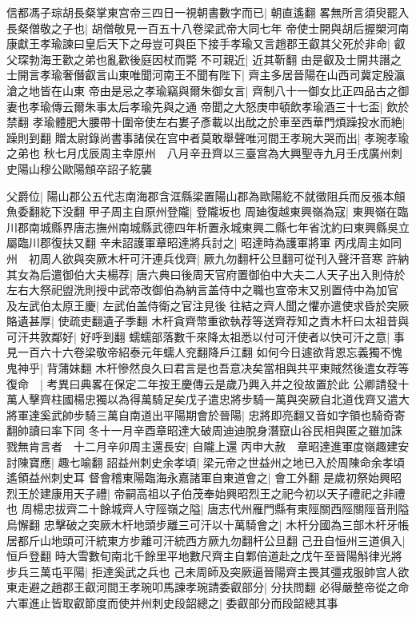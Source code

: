 信都馮子琮胡長粲掌東宫帝三四日一視朝書數字而已|{
	朝直遙翻}
畧無所言須臾罷入長粲僧敬之子也|{
	胡僧敬見一百五十八卷梁武帝大同七年}
帝使士開與胡后握槊河南康獻王孝瑜諫曰皇后天下之母豈可與臣下接手孝瑜又言趙郡王叡其父死於非命|{
	叡父琛勃海王歡之弟也亂歡後庭因杖而斃}
不可親近|{
	近其靳翻}
由是叡及士開共譖之士開言孝瑜奢僭叡言山東唯聞河南王不聞有陛下|{
	齊主多居晉陽在山西司冀定殷瀛滄之地皆在山東}
帝由是忌之孝瑜竊與爾朱御女言|{
	齊制八十一御女比正四品古之御妻也孝瑜傳云爾朱事太后孝瑜先與之通}
帝聞之大怒庚申頓飲孝瑜酒三十七盃|{
	飲於禁翻}
孝瑜體肥大腰帶十圍帝使左右婁子彥載以出酖之於車至西華門煩躁投水而絶|{
	躁則到翻}
贈太尉錄尚書事諸侯在宫中者莫敢舉聲唯河間王孝琬大哭而出|{
	孝琬孝瑜之弟也}
秋七月戊辰周主幸原州　八月辛丑齊以三臺宫為大興聖寺九月壬戌廣州刺史陽山穆公歐陽頠卒詔子紇襲

父爵位|{
	陽山郡公五代志南海郡含洭縣梁置陽山郡為歐陽紇不就徵阻兵而反張本頠魚委翻紇下没翻}
甲子周主自原州登隴|{
	登隴坂也}
周廸復越東興嶺為寇|{
	東興嶺在臨川郡南城縣界唐志撫州南城縣武德四年析置永城東興二縣七年省沈約曰東興縣吳立屬臨川郡復扶又翻}
辛未詔護軍章昭達將兵討之|{
	昭達時為護軍將軍}
丙戌周主如同州　初周人欲與突厥木杆可汗連兵伐齊|{
	厥九勿翻杆公旦翻可從刊入聲汗音寒}
許納其女為后遣御伯大夫楊荐|{
	唐六典曰後周天官府置御伯中大夫二人天子出入則侍於左右大祭祀盥洗則授中武帝改御伯為納言盖侍中之職也宣帝末又别置侍中為加官}
及左武伯太原王慶|{
	左武伯盖侍衛之官注見後}
往結之齊人聞之懼亦遣使求昏於突厥賂遺甚厚|{
	使疏吏翻遺子季翻}
木杆貪齊幣重欲執荐等送齊荐知之責木杆曰太祖昔與可汗共敦鄰好|{
	好呼到翻}
蠕蠕部落數千來降太祖悉以付可汗使者以快可汗之意|{
	事見一百六十六卷梁敬帝紹泰元年蠕人兖翻降戶江翻}
如何今日遽欲背恩忘義獨不愧鬼神乎|{
	背蒲妹翻}
木杆慘然良久曰君言是也吾意决矣當相與共平東賊然後遣女荐等復命　|{
	考異曰典畧在保定二年按王慶傳云是歲乃興入并之役故置於此}
公卿請發十萬人擊齊柱國楊忠獨以為得萬騎足矣戊子遣忠將步騎一萬與突厥自北道伐齊又遣大將軍達奚武帥步騎三萬自南道出平陽期會於晉陽|{
	忠將即亮翻又音如字領也騎奇寄翻帥讀曰率下同}
冬十一月辛酉章昭達大破周迪迪脫身潛竄山谷民相與匿之雖加誅戮無肯言者　十二月辛卯周主還長安|{
	自隴上還}
丙申大赦　章昭達進軍度嶺趣建安討陳寶應|{
	趣七喻翻}
詔益州刺史余孝頃|{
	梁元帝之世益州之地已入於周陳命余孝頃遙領益州刺史耳}
督會稽東陽臨海永嘉諸軍自東道會之|{
	會工外翻}
是歲初祭始興昭烈王於建康用天子禮|{
	帝嗣高祖以子伯茂奉始興昭烈王之祀今初以天子禮祀之非禮也}
周楊忠拔齊二十餘城齊人守陘嶺之隘|{
	唐志代州雁門縣有東陘關西陘關陘音刑隘烏懈翻}
忠擊破之突厥木杆地頭步離三可汗以十萬騎會之|{
	木杆分國為三部木杆牙帳居都斤山地頭可汗統東方步離可汗統西方厥九勿翻杆公旦翻}
己丑自恒州三道俱入|{
	恒戶登翻}
時大雪數旬南北千餘里平地數尺齊主自鄴倍道赴之戊午至晉陽斛律光將步兵三萬屯平陽|{
	拒達奚武之兵也}
己未周師及突厥逼晉陽齊主畏其彊戎服帥宫人欲東走避之趙郡王叡河間王孝琬叩馬諫孝琬請委叡部分|{
	分扶問翻}
必得嚴整帝從之命六軍進止皆取叡節度而使并州刺史段韶總之|{
	委叡部分而段韶總其事}


